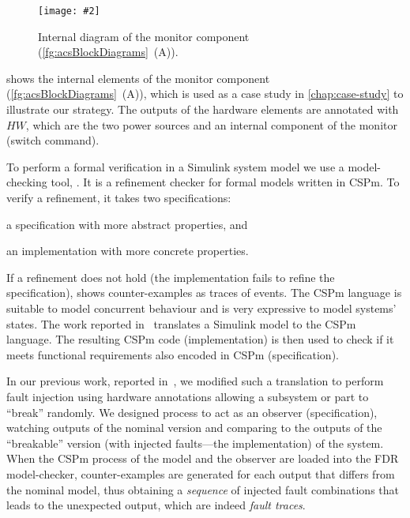 \documentclass[12pt,openright,twoside,a4paper,oldfontcommands,english,brazil,final]{abntex2}
\theoremstyle{theo}
\newcommand{\includegraphicsaspectratio}[2][1]{%
  \texttt{[image: \#2]}%
}
\newcommand{\textsim}[1]{$#1$}
\newcommand{\simulink}{Simulink\xspace}
\begin{document}
\begin{figure}[htb]
  \centering
  \includegraphicsaspectratio[0.6]{blockDiagramMonitorInternals}
  \caption{Internal diagram of the monitor component (\cref{fg:acsBlockDiagrams}~(A)).}
  \label{fg:blockDiagramMonitorInternals}
\end{figure}

 shows the internal elements of the monitor component (\cref{fg:acsBlockDiagrams}~(A)), which is used as a case study in \cref{chap:case-study} to illustrate our
strategy.
The outputs of the hardware elements are annotated with \textsim{HW}, which are the two power sources and an internal component of the monitor (switch command).


To perform a formal verification in a \simulink system model we use a model-checking tool, .
It is a refinement checker for formal models written in \ac{CSPm}.
To verify a refinement, it takes two specifications:
\begin{alineasinline}
  \item a specification with more abstract properties, and
  \item an implementation with more concrete properties.
\end{alineasinline}
If a refinement does not hold (the implementation fails to refine the specification),  shows counter-examples as traces of events.
The \ac{CSPm} language is suitable to model concurrent behaviour and is very expressive to model systems' states.
The work reported in~\cite{JMS+2011} translates a \simulink model to the \ac{CSPm} language.
%
The resulting \ac{CSPm} code (implementation) is then used to check if it meets functional requirements also encoded in \ac{CSPm} (specification).

In our previous work, reported in~\cite{DM2012}, we modified such a translation to perform fault injection using hardware annotations allowing a subsystem or part to ``break'' randomly.
%
We designed  process to act as an observer (specification), watching outputs of the nominal version and comparing to the outputs of the ``breakable'' version (with injected faults---the implementation) of the system.
%
When the \ac{CSPm} process of the model and the observer are loaded into the \acs{FDR} model-checker, counter-examples are generated for each output that differs from the nominal model, thus obtaining a \emph{sequence} of injected fault combinations that leads to the unexpected output, which are indeed \emph{fault traces}.
\end{document}
